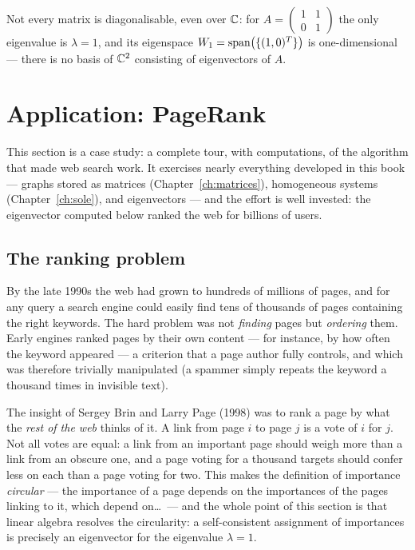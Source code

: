\begin{warning}
Not every matrix is diagonalisable, even over $\mathbb{C}$: for
$A = \left( \begin{smallmatrix} 1 & 1\\ 0 & 1 \end{smallmatrix} \right)$ the only eigenvalue is
$\lambda = 1$, and its eigenspace $W_1 = \operatorname{span}\!\left(\{(1,0)^T\}\right)$ is one-dimensional — there is no basis of
$\mathbb{C}^2$ consisting of eigenvectors of $A$.
\end{warning}

\section{Application: PageRank}\label{sec:pagerank}

This section is a case study: a complete tour, with computations, of the algorithm that made web search
work. It exercises nearly everything developed in this book — graphs stored as matrices
(Chapter~\ref{ch:matrices}), homogeneous systems (Chapter~\ref{ch:sole}), and eigenvectors — and the
effort is well invested: the eigenvector computed below ranked the web for billions of users.

\subsection{The ranking problem}

By the late 1990s the web had grown to hundreds of millions of pages, and for any query a search engine
could easily find tens of thousands of pages containing the right keywords. The hard problem was not
\emph{finding} pages but \emph{ordering} them. Early engines ranked pages by their own content — for
instance, by how often the keyword appeared — a criterion that a page author fully controls, and which
was therefore trivially manipulated (a spammer simply repeats the keyword a thousand times in invisible
text).

The insight of Sergey Brin and Larry Page (1998) was to rank a page by what the \emph{rest of the web}
thinks of it. A link from page $i$ to page $j$ is a vote of $i$ for $j$. Not all votes are equal: a link
from an important page should weigh more than a link from an obscure one, and a page voting for a
thousand targets should confer less on each than a page voting for two. This makes the definition of
importance \emph{circular} — the importance of a page depends on the importances of the pages linking to
it, which depend on\ldots\ — and the whole point of this section is that linear algebra resolves the
circularity: a self-consistent assignment of importances is precisely an eigenvector for the eigenvalue
$\lambda = 1$.

